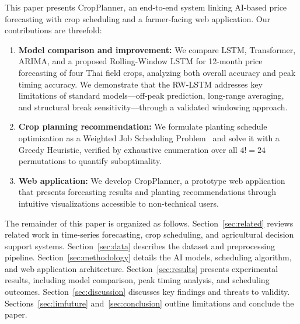 \documentclass[journal]{IEEEtran}
\begin{document}
This paper presents CropPlanner, an end-to-end system linking AI-based price forecasting with crop scheduling and a farmer-facing web application. Our contributions are threefold:

\begin{enumerate}
  \item \textbf{Model comparison and improvement:} We compare LSTM, Transformer, ARIMA, and a proposed Rolling-Window LSTM for 12-month price forecasting of four Thai field crops, analyzing both overall accuracy and peak timing accuracy. We demonstrate that the RW-LSTM addresses key limitations of standard models---off-peak prediction, long-range averaging, and structural break sensitivity---through a validated windowing approach.
  \item \textbf{Crop planning recommendation:} We formulate planting schedule optimization as a Weighted Job Scheduling Problem~\cite{clrs2009} and solve it with a Greedy Heuristic, verified by exhaustive enumeration over all $4! = 24$ permutations to quantify suboptimality.
  \item \textbf{Web application:} We develop CropPlanner, a prototype web application that presents forecasting results and planting recommendations through intuitive visualizations accessible to non-technical users.
\end{enumerate}

The remainder of this paper is organized as follows. Section~\ref{sec:related} reviews related work in time-series forecasting, crop scheduling, and agricultural decision support systems. Section~\ref{sec:data} describes the dataset and preprocessing pipeline. Section~\ref{sec:methodology} details the AI models, scheduling algorithm, and web application architecture. Section~\ref{sec:results} presents experimental results, including model comparison, peak timing analysis, and scheduling outcomes. Section~\ref{sec:discussion} discusses key findings and threats to validity. Sections~\ref{sec:limfuture} and~\ref{sec:conclusion} outline limitations and conclude the paper.
\end{document}
